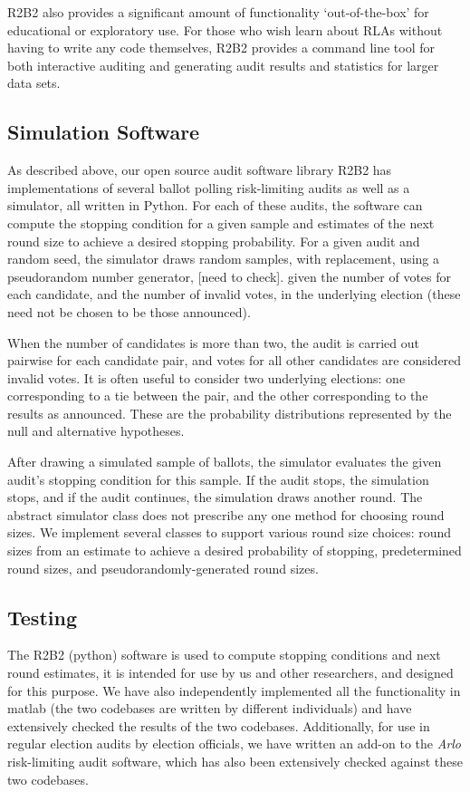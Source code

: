 R2B2 also provides a significant amount of functionality `out-of-the-box' for educational
or exploratory use. For those who wish learn about RLAs without having to write any
code themselves, R2B2 provides a command line tool for both interactive auditing and
generating audit results and statistics for larger data sets.

\subsection{Simulation Software}
As described above, our open source audit software library R2B2 has implementations of several ballot polling risk-limiting audits as well as a simulator, 
all written in Python.
For each of these audits, the software can compute the stopping condition for a given sample and estimates
of the next round size to achieve a desired stopping probability. 
For a given audit and random seed, the simulator draws random samples, with replacement, using a pseudorandom number generator, [need to check].
given the number of votes for each candidate, and the number of invalid votes, in the underlying election (these need not be chosen to be those announced). 

When the number of candidates is more than two, the audit is carried out pairwise for each candidate pair, and votes for all other candidates are considered invalid votes. 
It is often useful to consider two underlying elections: one corresponding to a tie between the pair, and the other corresponding to the results as announced. These are the probability distributions represented
by the null and alternative hypotheses.

After drawing a simulated sample of ballots, the simulator evaluates the given audit's stopping condition for this sample.
If the audit stops, the simulation stops, and if the audit continues, the simulation draws another round. 
The abstract simulator class does not prescribe any one method for choosing round sizes. 
We implement several classes to support various round size choices: 
round sizes from an estimate to achieve a desired probability of stopping, 
predetermined round sizes, and pseudorandomly-generated round sizes. 

\subsection{Testing}

The R2B2 (python) software is used to compute stopping conditions and next round estimates, it is intended for use by us and other researchers, and designed for this purpose. We have also independently implemented all the functionality in matlab (the two codebases are written by different individuals) and have extensively checked the results of the two codebases. Additionally, for use in regular election audits by election officials, we have written an add-on to the {\em Arlo} risk-limiting audit software, which has also been extensively checked against these two codebases. 


